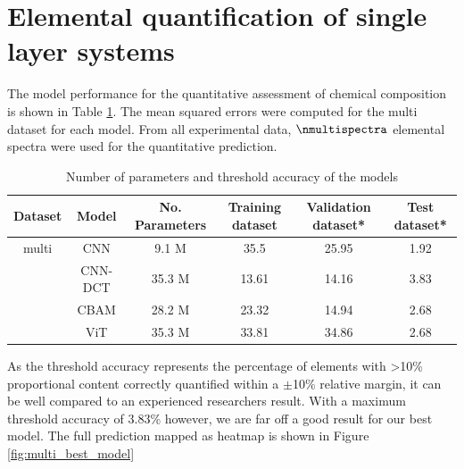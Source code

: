 \section{Elemental quantification of single layer systems}

The model performance for the quantitative assessment of chemical composition is shown in Table \ref{tab:acc_quant}. The mean squared errors were computed for the multi dataset for each model.
From all experimental data, $\nmultispectra$ elemental spectra were used for the quantitative prediction. 

\begin{table}[H]
    \centering
    \begin{tabular}{c|c|c|c|c|c}
       Dataset & Model   & No. Parameters & Training dataset & Validation dataset*  & Test dataset*    \\
        \hline
        multi  & CNN     &   9.1 M        &     35.5       &   25.95                 &  1.92      \\
               & CNN-DCT &  35.3 M        &    13.61          &    14.16            &    3.83   \\
               & CBAM    & 28.2 M         &    23.32         &    14.94             &  2.68   \\ %
               & ViT     &   35.3 M     &    33.81       &      34.86    &   2.68        \\
    \end{tabular}
    \caption{Number of parameters and threshold accuracy of the models}
    \label{tab:acc_quant}
\end{table}

As the threshold accuracy represents the percentage of elements with >10\% proportional content correctly quantified within a $\pm$10\% relative margin, it can be well compared to an experienced researchers result. With a maximum threshold accuracy of 3.83\% however, we are far off a good result for our best model. The full prediction mapped as heatmap is shown in Figure \ref{fig:multi_best_model}

